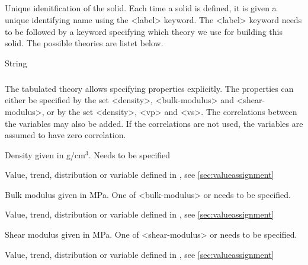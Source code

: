 {\subparagraph{}
 \slist
   \item \Description Unique idenitfication of the solid. Each time a solid is defined, it is given a unique identifying name using
the <label> keyword. The <label> keyword needs to be followed by a keyword specifying which theory we use for building this solid. The possible theories are listet below.
   \item \Argument String
   \item \Default
 \elist

\subparagraph{}
 \slist
   \item \Description The tabulated theory allows specifying properties explicitly. The properties can either be specified by the set <density>, <bulk-modulus> and <shear-modulus>, or by the set <density>, <vp> and <vs>. The correlations between the variables may also be added. If the correlations are not used, the variables are assumed to have zero correlation.
   \item \Argument
   \item \Default
 \elist

 \slist
   \item \Description Density given in g/cm$^3$. Needs to be specified
   \item \Argument Value, trend, distribution or variable defined in , see \autoref{sec:valueassignment}
   \item \Default
 \elist

 \slist
   \item \Description Bulk modulus given in MPa. One of <bulk-modulus> or  needs to be specified.
   \item \Argument Value, trend, distribution or variable defined in , see \autoref{sec:valueassignment}
   \item \Default
 \elist

 \slist
   \item \Description Shear modulus given in MPa. One of <shear-modulus> or  needs to be specified.
   \item \Argument Value, trend, distribution or variable defined in , see \autoref{sec:valueassignment}
   \item \Default
 \elist

}
